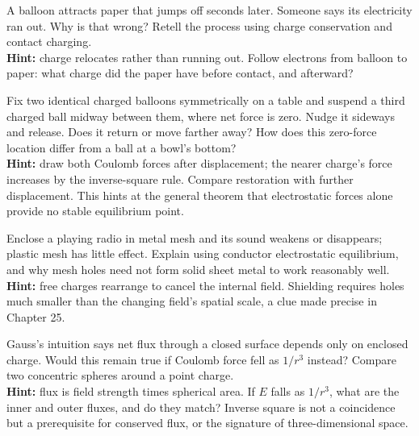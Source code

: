 \begin{puzzles}
  \item A balloon attracts paper that jumps off seconds later. Someone says its electricity ran out. Why is that wrong? Retell the process using charge conservation and contact charging.\\
  \textbf{Hint:} charge relocates rather than running out. Follow electrons from balloon to paper: what charge did the paper have before contact, and afterward?
  \item Fix two identical charged balloons symmetrically on a table and suspend a third charged ball midway between them, where net force is zero. Nudge it sideways and release. Does it return or move farther away? How does this zero-force location differ from a ball at a bowl's bottom?\\
  \textbf{Hint:} draw both Coulomb forces after displacement; the nearer charge's force increases by the inverse-square rule. Compare restoration with further displacement. This hints at the general theorem that electrostatic forces alone provide no stable equilibrium point.
  \item Enclose a playing radio in metal mesh and its sound weakens or disappears; plastic mesh has little effect. Explain using conductor electrostatic equilibrium, and why mesh holes need not form solid sheet metal to work reasonably well.\\
  \textbf{Hint:} free charges rearrange to cancel the internal field. Shielding requires holes much smaller than the changing field's spatial scale, a clue made precise in Chapter 25.
  \item Gauss's intuition says net flux through a closed surface depends only on enclosed charge. Would this remain true if Coulomb force fell as \(1/r^3\) instead? Compare two concentric spheres around a point charge.\\
  \textbf{Hint:} flux is field strength times spherical area. If \(E\) falls as \(1/r^3\), what are the inner and outer fluxes, and do they match? Inverse square is not a coincidence but a prerequisite for conserved flux, or the signature of three-dimensional space.
\end{puzzles}
